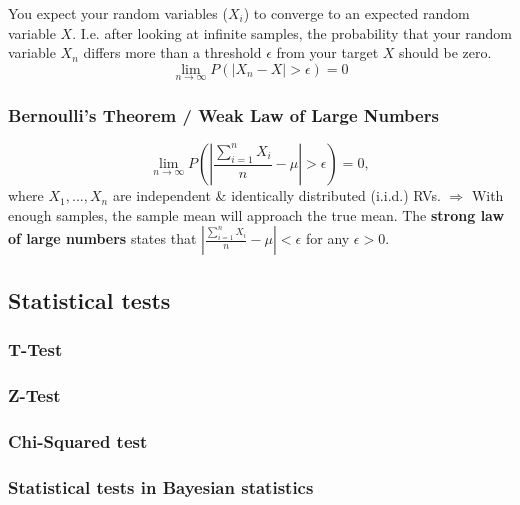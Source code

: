 \documentclass[
]{book}
\begin{document}
You expect your random variables (\(X_i\)) to converge to an expected
random variable \(X\). I.e. after looking at infinite samples, the
probability that your random variable \(X_n\) differs more than a
threshold \(\epsilon\) from your target \(X\) should be zero.
\[\lim_{n \rightarrow \infty} P(|X_n - X| > \epsilon) = 0\]

\hypertarget{bernoullis-theorem-weak-law-of-large-numbers}{%
\subsubsection{Bernoulli's Theorem / Weak Law of Large Numbers}\label{bernoullis-theorem-weak-law-of-large-numbers}}

\[\lim_{n \rightarrow \infty} P(|\frac{\sum_{i=1}^n X_i}{n} - \mu| > \epsilon) = 0,\]
where \(X_1,...,X_n\) are independent \& identically distributed (i.i.d.)
RVs. \(\Rightarrow\) With enough samples, the sample mean will approach
the true mean. The \textbf{strong law of large numbers} states that
\(|\frac{\sum_{i=1}^n X_i}{n} - \mu| < \epsilon\) for any \(\epsilon > 0\).

\hypertarget{statistical-tests}{%
\subsection{Statistical tests}\label{statistical-tests}}

\hypertarget{t-test}{%
\subsubsection{T-Test}\label{t-test}}

\hypertarget{z-test}{%
\subsubsection{Z-Test}\label{z-test}}

\hypertarget{chi-squared-test}{%
\subsubsection{Chi-Squared test}\label{chi-squared-test}}

\hypertarget{statistical-tests-in-bayesian-statistics}{%
\subsubsection{Statistical tests in Bayesian statistics}\label{statistical-tests-in-bayesian-statistics}}
\end{document}
